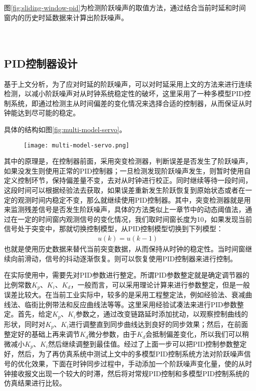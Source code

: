 图\ref{fig:sliding-window-pid}为检测阶跃噪声的取值方法，通过结合当前时延和时间窗内的历史时延数据来计算出阶跃噪声。
\\ \\ \\
\subsection{PID控制器设计}
基于上文分析，为了应对时延的阶跃噪声，可以对时延采用上文的方法来进行连续检测，以减小阶跃噪声对从时钟系统稳定性的破坏，这里采用了一种多模型PID控制系统，即通过检测主从时间偏差的变化情况来选择合适的控制器，从而保证从时钟能达到尽可能的稳定。

具体的结构如图\ref{fig:multi-model-servo}。
\begin{figure}[htbp]
  \centering
  \begin{minipage}[b]{0.7\textwidth}
   \captionstyle{\centering}
   \centering
   \texttt{[image: multi-model-servo.png]}
  \end{minipage}     
\end{figure}

其中的原理是，在控制器前面，采用突变检测器，判断误差是否发生了阶跃噪声，如果没发生则使用正常的PID控制器；一旦检测发现阶跃噪声发生，则暂时使用自定义控制环节，保持偏差量不变，去对从时钟进行校正。同时继续等待一段时间，这段时间可以根据经验法去获取，如果误差重新发生阶跃恢复到原始状态或者在一定的观测时间内稳定不变，那么就继续使用PID控制器。其中，突变检测器就是用来监测残差信号是否发生阶跃噪声，具体的方法类似上一章节中的动态阈值法，通过在一定的时间窗内观测信号的变化情况，我们取时间窗长度为10，如果发现当前信号处于突变中，那就切换控制模型，从PID控制模型切换到下列模型：
\begin {align}
u(k) = u(k-1)
\end{align}
也就是使用历史数据来替代当前突变数据，从而保持从时钟的稳定性。当时间窗继续向前滑动，信号的抖动逐渐恢复。则可以恢复使用PID控制器来进行控制。

在实际使用中，需要先对PID参数进行整定。所谓PID参数整定就是确定调节器的比例常数$K_{p}$、$K_{i}$、$K_{d}$，一般而言，可以采用理论计算来进行参数整定，但是一般误差比较大。在当前工业实际中，较多的是采用工程整定法，例如经验法、衰减曲线法、临街比例带法和反应曲线法等等。这里采用经验试凑法来进行PID参数整定。首先，给定$K_{p}$、$K_{i}$参数之，通过改变链路延时添加扰动，以观察控制曲线的形状，同时对$K_{p}$、$K_{i}$进行调整直到同步曲线达到良好的同步效果；然后，在前面整定好的基础上再来调节$K_{d}$微分参数，由于$K_{d}$会抵制偏差变化，所以我们可以稍微减小$K_{p}$、$K_{i}$然后继续调整到最佳值。经过了上面一步可以把PID控制参数整定好，然后，为了再仿真系统中测试上文中的多模型PID控制系统方法对阶跃噪声信号的优化效果，下面在时钟同步过程中，手动添加一个阶跃噪声变化量，使的从时钟接收报文出现一个较大的时滞，然后将对常规PID控制和多模型PID控制系统的仿真结果进行比较。

